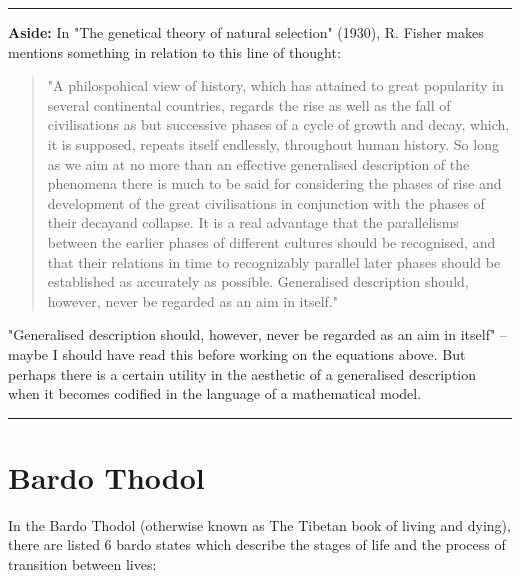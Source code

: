 \vspace{10pt}

\hrule

\vspace{10pt}



\noindent
\textbf{Aside:} In "The genetical theory of natural selection" (1930),  R.  Fisher makes mentions something in relation to this line of thought: 

\begin{quote}
\noindent
"A philospohical view of history, which has attained to great popularity in several continental countries,  regards the rise as well as the fall of civilisations as but successive phases of a cycle of growth and decay,  which, it is supposed, repeats itself endlessly,  throughout human history.  So long as we aim at no more than an effective generalised description of the phenomena there is much to be said for considering the phases of rise and development of the great civilisations in conjunction with the phases of their decayand collapse. It is a real advantage that the parallelisms between the earlier phases of different cultures should be recognised, and that their relations in time to recognizably parallel later phases should be established as accurately as possible.  Generalised description should, however,  never be regarded as an aim in itself."
\end{quote}

"Generalised description should, however,  never be regarded as an aim in itself" -- maybe I should have read this before working on the equations above.  But perhaps there is a certain utility in the aesthetic of a generalised description when it becomes codified in the language of a mathematical model. 




\vspace{10pt}

\hrule


\vspace{10pt}





\section*{Bardo Thodol}

 In the Bardo Thodol (otherwise known as The Tibetan book of living and dying), there are listed 6 bardo states which describe the stages of life and the process of transition between lives:

